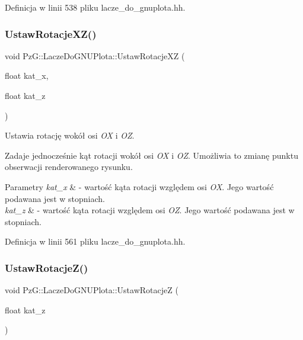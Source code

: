 Definicja w linii 538 pliku lacze\+\_\+do\+\_\+gnuplota.\+hh.

\mbox{\label{class_pz_g_1_1_lacze_do_g_n_u_plota_a94d8527fd78048ed6cb32ffb29e5f903}} 
\subsubsection{\texorpdfstring{Ustaw\+Rotacje\+X\+Z()}{UstawRotacjeXZ()}}
{\footnotesize\ttfamily void Pz\+G\+::\+Lacze\+Do\+G\+N\+U\+Plota\+::\+Ustaw\+Rotacje\+XZ (\begin{DoxyParamCaption}\item[{float}]{kat\+\_\+x,  }\item[{float}]{kat\+\_\+z }\end{DoxyParamCaption})\hspace{0.3cm}{\ttfamily [inline]}}



Ustawia rotację wokół osi {\itshape OX} i {\itshape OZ}. 

Zadaje jednocześnie kąt rotacji wokół osi {\itshape OX} i {\itshape OZ}. Umożliwia to zmianę punktu obserwacji renderowanego rysunku. 
\begin{DoxyParams}{Parametry}
{\em kat\+\_\+x} & -\/ wartość kąta rotacji względem osi {\itshape OX}. Jego wartość podawana jest w stopniach. \\
\hline
{\em kat\+\_\+z} & -\/ wartość kąta rotacji względem osi {\itshape OZ}. Jego wartość podawana jest w stopniach. \\
\hline
\end{DoxyParams}


Definicja w linii 561 pliku lacze\+\_\+do\+\_\+gnuplota.\+hh.

\mbox{\label{class_pz_g_1_1_lacze_do_g_n_u_plota_a458399aa2a8f4b3f00ccd5b272857ea1}} 
\subsubsection{\texorpdfstring{Ustaw\+Rotacje\+Z()}{UstawRotacjeZ()}}
{\footnotesize\ttfamily void Pz\+G\+::\+Lacze\+Do\+G\+N\+U\+Plota\+::\+Ustaw\+RotacjeZ (\begin{DoxyParamCaption}\item[{float}]{kat\+\_\+z }\end{DoxyParamCaption})\hspace{0.3cm}{\ttfamily [inline]}}



